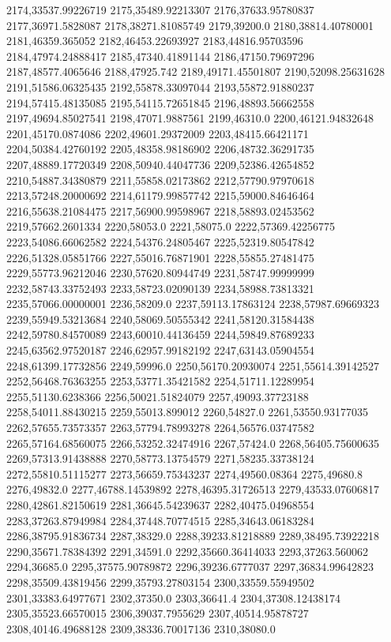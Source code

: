 2174,33537.99226719
2175,35489.92213307
2176,37633.95780837
2177,36971.5828087
2178,38271.81085749
2179,39200.0
2180,38814.40780001
2181,46359.365052
2182,46453.22693927
2183,44816.95703596
2184,47974.24888417
2185,47340.41891144
2186,47150.79697296
2187,48577.4065646
2188,47925.742
2189,49171.45501807
2190,52098.25631628
2191,51586.06325435
2192,55878.33097044
2193,55872.91880237
2194,57415.48135085
2195,54115.72651845
2196,48893.56662558
2197,49694.85027541
2198,47071.9887561
2199,46310.0
2200,46121.94832648
2201,45170.0874086
2202,49601.29372009
2203,48415.66421171
2204,50384.42760192
2205,48358.98186902
2206,48732.36291735
2207,48889.17720349
2208,50940.44047736
2209,52386.42654852
2210,54887.34380879
2211,55858.02173862
2212,57790.97970618
2213,57248.20000692
2214,61179.99857742
2215,59000.84646464
2216,55638.21084475
2217,56900.99598967
2218,58893.02453562
2219,57662.2601334
2220,58053.0
2221,58075.0
2222,57369.42256775
2223,54086.66062582
2224,54376.24805467
2225,52319.80547842
2226,51328.05851766
2227,55016.76871901
2228,55855.27481475
2229,55773.96212046
2230,57620.80944749
2231,58747.99999999
2232,58743.33752493
2233,58723.02090139
2234,58988.73813321
2235,57066.00000001
2236,58209.0
2237,59113.17863124
2238,57987.69669323
2239,55949.53213684
2240,58069.50555342
2241,58120.31584438
2242,59780.84570089
2243,60010.44136459
2244,59849.87689233
2245,63562.97520187
2246,62957.99182192
2247,63143.05904554
2248,61399.17732856
2249,59996.0
2250,56170.20930074
2251,55614.39142527
2252,56468.76363255
2253,53771.35421582
2254,51711.12289954
2255,51130.6238366
2256,50021.51824079
2257,49093.37723188
2258,54011.88430215
2259,55013.899012
2260,54827.0
2261,53550.93177035
2262,57655.73573357
2263,57794.78993278
2264,56576.03747582
2265,57164.68560075
2266,53252.32474916
2267,57424.0
2268,56405.75600635
2269,57313.91438888
2270,58773.13754579
2271,58235.33738124
2272,55810.51115277
2273,56659.75343237
2274,49560.08364
2275,49680.8
2276,49832.0
2277,46788.14539892
2278,46395.31726513
2279,43533.07606817
2280,42861.82150619
2281,36645.54239637
2282,40475.04968554
2283,37263.87949984
2284,37448.70774515
2285,34643.06183284
2286,38795.91836734
2287,38329.0
2288,39233.81218889
2289,38495.73922218
2290,35671.78384392
2291,34591.0
2292,35660.36414033
2293,37263.560062
2294,36685.0
2295,37575.90789872
2296,39236.6777037
2297,36834.99642823
2298,35509.43819456
2299,35793.27803154
2300,33559.55949502
2301,33383.64977671
2302,37350.0
2303,36641.4
2304,37308.12438174
2305,35523.66570015
2306,39037.7955629
2307,40514.95878727
2308,40146.49688128
2309,38336.70017136
2310,38080.0
